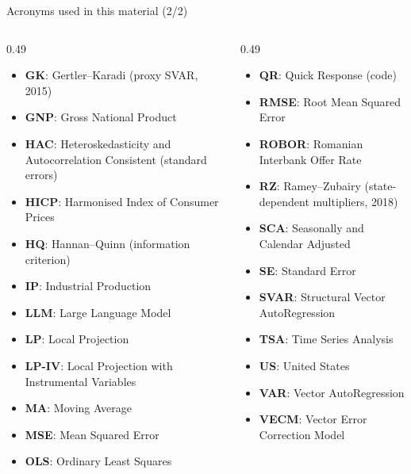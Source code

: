 \begin{frame}{Acronyms used in this material (2/2)}
\begin{columns}[T]
\begin{column}{0.49\textwidth}
\begin{itemize}\setlength{\itemsep}{0pt}
    \item \textbf{GK}: Gertler–Karadi (proxy SVAR, 2015)
    \item \textbf{GNP}: Gross National Product
    \item \textbf{HAC}: Heteroskedasticity and Autocorrelation Consistent (standard errors)
    \item \textbf{HICP}: Harmonised Index of Consumer Prices
    \item \textbf{HQ}: Hannan–Quinn (information criterion)
    \item \textbf{IP}: Industrial Production
    \item \textbf{LLM}: Large Language Model
    \item \textbf{LP}: Local Projection
    \item \textbf{LP-IV}: Local Projection with Instrumental Variables
    \item \textbf{MA}: Moving Average
    \item \textbf{MSE}: Mean Squared Error
    \item \textbf{OLS}: Ordinary Least Squares
\end{itemize}
\end{column}
\begin{column}{0.49\textwidth}
\begin{itemize}\setlength{\itemsep}{0pt}
    \item \textbf{QR}: Quick Response (code)
    \item \textbf{RMSE}: Root Mean Squared Error
    \item \textbf{ROBOR}: Romanian Interbank Offer Rate
    \item \textbf{RZ}: Ramey–Zubairy (state-dependent multipliers, 2018)
    \item \textbf{SCA}: Seasonally and Calendar Adjusted
    \item \textbf{SE}: Standard Error
    \item \textbf{SVAR}: Structural Vector AutoRegression
    \item \textbf{TSA}: Time Series Analysis
    \item \textbf{US}: United States
    \item \textbf{VAR}: Vector AutoRegression
    \item \textbf{VECM}: Vector Error Correction Model
\end{itemize}
\end{column}
\end{columns}
\end{frame}

